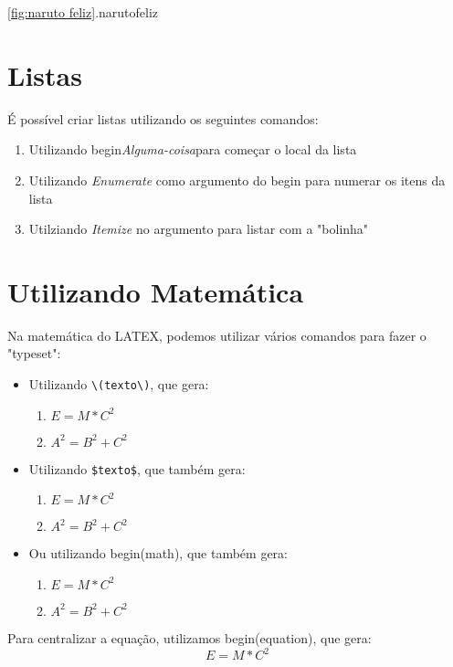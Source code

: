 \documentclass[12pt, a4paper]{article}
\begin{document}
\ref{fig:naruto feliz}.narutofeliz %

\section{Listas}

É possível criar listas utilizando os seguintes comandos:
\begin{enumerate}
    \item Utilizando begin{\textit{Alguma-coisa}}para começar o local da lista
    \item Utilizando \textit{Enumerate} como argumento do begin para numerar os itens da lista
    \item Utilziando \textit{Itemize} no argumento para listar com a "bolinha"
\end{enumerate}

\section{Utilizando Matemática}

Na matemática do LATEX, podemos utilizar vários comandos para fazer o "typeset":

\begin{itemize}
    \item Utilizando \verb|\(texto\)|, que gera:
        \begin{enumerate}
            \item \(E = M*C^2\)
            \item \(A^2 = B^2 + C^2\)
        \end{enumerate}
    \item Utilizando \verb|$texto$|, que também gera:
        \begin{enumerate}
            \item $E = M*C^2$
            \item $A^2 = B^2 + C^2$
        \end{enumerate}
    \item Ou utilizando begin(math), que também gera:
        \begin{enumerate}
            \item \begin{math}
                E = M*C^2
            \end{math}
            \item \begin{math}
                A^2 = B^2 + C^2
            \end{math}
        \end{enumerate}  
\end{itemize}
Para centralizar a equação, utilizamos begin(equation), que gera:
\[E = M*C^2\]
\end{document}
